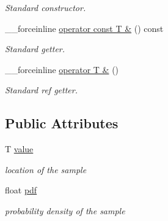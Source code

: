 \begin{DoxyCompactItemize}
\begin{DoxyCompactList}\small\item\em Standard constructor. \item\end{DoxyCompactList}\item 
\hypertarget{structembree_1_1_sample_af8da71f8f7125c4a82d1675ac55360ac}{
\_\-\_\-forceinline \hyperlink{structembree_1_1_sample_af8da71f8f7125c4a82d1675ac55360ac}{operator const T \&} () const }
\label{structembree_1_1_sample_af8da71f8f7125c4a82d1675ac55360ac}

\begin{DoxyCompactList}\small\item\em Standard getter. \item\end{DoxyCompactList}\item 
\hypertarget{structembree_1_1_sample_a3d3b91ac749ab0157a08aafdda791f70}{
\_\-\_\-forceinline \hyperlink{structembree_1_1_sample_a3d3b91ac749ab0157a08aafdda791f70}{operator T \&} ()}
\label{structembree_1_1_sample_a3d3b91ac749ab0157a08aafdda791f70}

\begin{DoxyCompactList}\small\item\em Standard ref getter. \item\end{DoxyCompactList}\end{DoxyCompactItemize}
\subsection*{Public Attributes}
\begin{DoxyCompactItemize}
\item 
\hypertarget{structembree_1_1_sample_a472517083f9479b3fc23f8cbb33ff514}{
T \hyperlink{structembree_1_1_sample_a472517083f9479b3fc23f8cbb33ff514}{value}}
\label{structembree_1_1_sample_a472517083f9479b3fc23f8cbb33ff514}

\begin{DoxyCompactList}\small\item\em location of the sample \item\end{DoxyCompactList}\item 
\hypertarget{structembree_1_1_sample_a67436809923a412a9a244f94f73b148a}{
float \hyperlink{structembree_1_1_sample_a67436809923a412a9a244f94f73b148a}{pdf}}
\label{structembree_1_1_sample_a67436809923a412a9a244f94f73b148a}

\begin{DoxyCompactList}\small\item\em probability density of the sample \item\end{DoxyCompactList}\end{DoxyCompactItemize}


